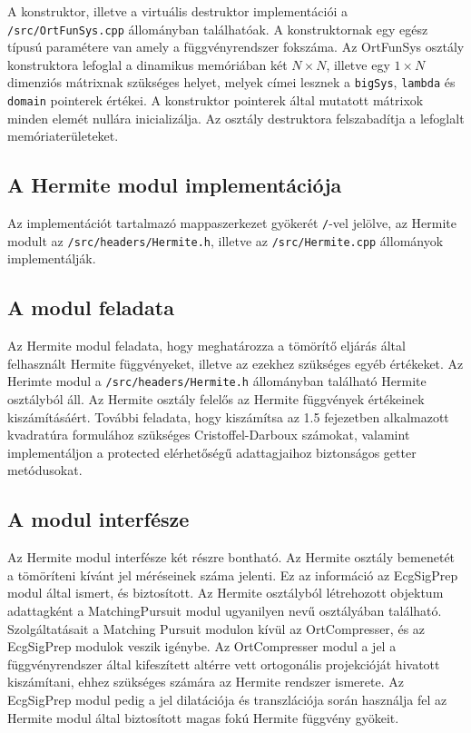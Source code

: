 \documentclass[oneside,titlepage,12pt,a4paper]{report}
\begin{document}
\par A konstruktor, illetve a virtuális destruktor implementációi a \texttt{/src/OrtFunSys.cpp} állományban találhatóak. A konstruktornak egy egész típusú paramétere van amely a függvényrendszer fokszáma. Az OrtFunSys osztály konstruktora lefoglal a dinamikus memóriában két $N\times N$, illetve egy $1\times N$ dimenziós mátrixnak szükséges helyet, melyek címei lesznek a \texttt{bigSys}, \texttt{lambda} és \texttt{domain} pointerek értékei. A konstruktor pointerek által mutatott mátrixok minden elemét nullára inicializálja. Az osztály destruktora felszabadítja a lefoglalt memóriaterületeket. 


\subsection{A Hermite modul implementációja}

Az implementációt tartalmazó mappaszerkezet gyökerét \texttt{/}-vel jelölve, az Hermite modult  az \texttt{/src/headers/Hermite.h}, illetve az \texttt{/src/Hermite.cpp} állományok implementálják.

\subsection*{A modul feladata}

\par Az Hermite modul feladata, hogy meghatározza a tömörítő eljárás által felhasznált Hermite függvényeket, illetve az ezekhez szükséges egyéb értékeket. Az Herimte modul a \texttt{/src/headers/Hermite.h} állományban található Hermite osztályból áll. Az Hermite osztály felelős az Hermite függvények értékeinek kiszámításáért. További feladata, hogy kiszámítsa az 1.5 fejezetben alkalmazott kvadratúra formulához szükséges Cristoffel-Darboux számokat, valamint implementáljon a protected elérhetőségű adattagjaihoz biztonságos getter metódusokat.

\subsection*{A modul interfésze}

\par Az Hermite modul interfésze két részre bontható. Az Hermite osztály bemenetét a tömöríteni kívánt jel méréseinek száma jelenti. Ez az információ az EcgSigPrep modul által ismert, és biztosított. Az Hermite osztályból létrehozott objektum adattagként a MatchingPursuit modul ugyanilyen nevű osztályában található. Szolgáltatásait a Matching Pursuit modulon kívül az OrtCompresser, és az EcgSigPrep modulok veszik igénybe. Az OrtCompresser modul a jel a függvényrendszer által kifeszített altérre vett ortogonális projekcióját hivatott kiszámítani, ehhez szükséges számára az Hermite rendszer ismerete. Az EcgSigPrep modul pedig a jel dilatációja és transzlációja során használja fel az Hermite modul által biztosított magas fokú Hermite függvény gyökeit.   
\end{document}
